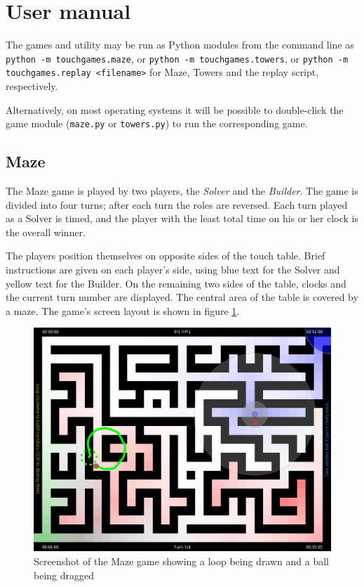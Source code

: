 \documentclass[a4paper,12pt]{article}
\begin{document}
\section{User manual}

The games and utility may be run as Python modules from the command line as
\texttt{python -m touchgames.maze}, or
\texttt{python -m touchgames.towers}, or
\texttt{python -m touchgames.replay <filename>} for Maze, Towers and the replay
script, respectively.

Alternatively, on most operating systems it will be possible to double-click
the game module (\texttt{maze.py} or \texttt{towers.py}) to run the
corresponding game.

\subsection{Maze}

The Maze game is played by two players, the \emph{Solver} and the
\emph{Builder}. The game is divided into four turns; after each turn the roles
are reversed.
Each turn played as a Solver is timed, and the player with the least total
time on his or her clock is the overall winner.

The players position themselves on opposite sides of the touch table.
Brief instructions are given on each player's side, using blue text for the
Solver and yellow text for the Builder.
On the remaining two sides of the table, clocks and the current turn number
are displayed.
The central area of the table is covered by a maze.
The game's screen layout is shown in figure \ref{scsh-maze}.

\begin{figure}[ht]\small
    \includegraphics[width=13cm]{scsh-maze}
\caption{Screenshot of the Maze game showing a loop being drawn and a ball
being dragged}
\label{scsh-maze}
\end{figure}
\end{document}
